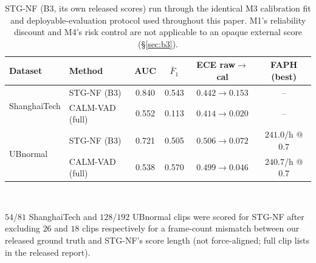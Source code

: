 \begin{table}[t]
\centering
\caption{STG-NF \cite{stgnf2023} (B3, its own released scores) run through the
identical M3 calibration fit and deployable-evaluation protocol used
throughout this paper. M1's reliability discount and M4's risk control are
not applicable to an opaque external score (\S\ref{sec:b3}).}
\label{tab:b3}
\setlength{\tabcolsep}{4pt}
\renewcommand{\arraystretch}{1.15}
\footnotesize
\begin{tabular}{@{}llcccc@{}}
\toprule
Dataset & Method & AUC & $\bar F_1$ & ECE raw$\to$cal & FAPH (best) \\
\midrule
\multirow{2}{*}{ShanghaiTech} & STG-NF (B3)      & 0.840 & 0.543 & $0.442\to0.153$ & -- \\
                              & CALM-VAD (full)  & 0.552 & 0.113 & $0.414\to0.020$ & -- \\
\midrule
\multirow{2}{*}{UBnormal}     & STG-NF (B3)      & 0.721 & 0.505 & $0.506\to0.072$ & $241.0$/h @ $0.7$ \\
                              & CALM-VAD (full)  & 0.538 & 0.570 & $0.499\to0.046$ & $240.7$/h @ $0.7$ \\
\bottomrule
\end{tabular}
\\[2pt]
\raggedright\footnotesize $54$/$81$ ShanghaiTech and $128$/$192$ UBnormal
clips were scored for STG-NF after excluding $26$ and $18$ clips respectively
for a frame-count mismatch between our released ground truth and STG-NF's
score length (not force-aligned; full clip lists in the released report).
\end{table}
